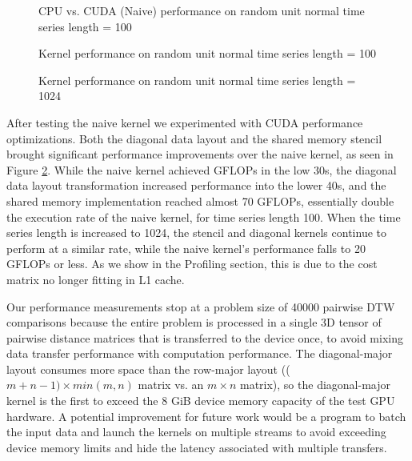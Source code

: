 \documentclass[12pt, letterpaper]{article}
\begin{document}
\begin{figure}[htbp]
    \begin{center}
        \scalebox{0.85}{}
    \end{center}
    \caption{CPU vs. CUDA (Naive) performance on random unit normal time series
      length = 100}
    \label{plot_cpu_gpu}
\end{figure}


\begin{figure}[htbp]
    \begin{center}
        \scalebox{0.85}{}
    \end{center}
    \caption{Kernel performance on random unit normal time series length =
      100}
    \label{plot_multi}
\end{figure}

\begin{figure}[htbp]
    \begin{center}
        \scalebox{0.85}{}
    \end{center}
    \caption{Kernel performance on random unit normal time series length =
      1024}
    \label{plot_multi_1024}
\end{figure}


After testing the naive kernel we experimented with CUDA performance
optimizations. Both the diagonal data layout and the shared memory stencil
brought significant performance improvements over the naive kernel, as seen in
Figure \ref{plot_multi}. While the naive kernel achieved GFLOPs in the low 30s,
the diagonal data layout transformation increased performance into the lower
40s, and the shared memory implementation reached almost 70 GFLOPs, essentially
double the execution rate of the naive kernel, for time series length 100. When
the time series length is increased to 1024, the stencil and diagonal kernels
continue to perform at a similar rate, while the naive kernel's performance
falls to 20 GFLOPs or less. As we show in the Profiling section, this is due to
the cost matrix no longer fitting in L1 cache.

Our performance measurements stop at a problem size of 40000 pairwise DTW
comparisons because the entire problem is processed in a single 3D tensor of
pairwise distance matrices that is transferred to the device once, to avoid
mixing data transfer performance with computation performance. The
diagonal-major layout consumes more space than the row-major layout (($m+n-1) \times
min(m,n)$ matrix vs. an $m \times n$ matrix), so the diagonal-major kernel is the
first to exceed the 8 GiB device memory capacity of the test GPU hardware. A
potential improvement for future work would be a program to batch the input data
and launch the kernels on multiple streams to avoid exceeding device memory
limits and hide the latency associated with multiple transfers.
\end{document}
